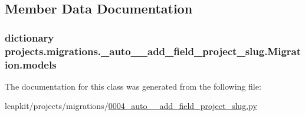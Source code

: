 \subsection{Member Data Documentation}
\hypertarget{classprojects_1_1migrations_1_10004__auto____add__field__project__slug_1_1_migration_aa38d03e3fb3428c3ea7fd6f0650bda3f}{
\subsubsection[{models}]{\setlength{\rightskip}{0pt plus 5cm}dictionary projects.\-migrations.\-\_\-auto\-\_\-\-\_\-add\-\_\-field\-\_\-project\-\_\-slug.\-Migration.\-models\hspace{0.3cm}{\ttfamily [static]}}}\label{classprojects_1_1migrations_1_10004__auto____add__field__project__slug_1_1_migration_aa38d03e3fb3428c3ea7fd6f0650bda3f}


The documentation for this class was generated from the following file\-:\begin{DoxyCompactItemize}
\item 
leapkit/projects/migrations/\hyperlink{0004__auto____add__field__project__slug_8py}{0004\-\_\-auto\-\_\-\-\_\-add\-\_\-field\-\_\-project\-\_\-slug.\-py}\end{DoxyCompactItemize}
